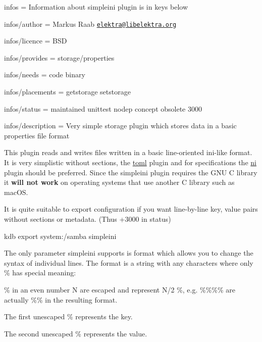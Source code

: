 
\begin{DoxyItemize}
\item infos = Information about simpleini plugin is in keys below
\item infos/author = Markus Raab \href{mailto:elektra@libelektra.org}{\tt elektra@libelektra.\+org}
\item infos/licence = B\+SD
\item infos/provides = storage/properties
\item infos/needs = code binary
\item infos/placements = getstorage setstorage
\item infos/status = maintained unittest nodep concept obsolete 3000
\item infos/description = Very simple storage plugin which stores data in a basic properties file format
\end{DoxyItemize}

This plugin reads and writes files written in a basic line-\/oriented ini-\/like format. It is very simplistic without sections, the \hyperlink{autotoc_md635_src_plugins_toml_README_md}{toml} plugin and for specifications the \hyperlink{autotoc_md469_src_plugins_ni_README_md}{ni} plugin should be preferred. Since the {\ttfamily simpleini} plugin requires the G\+NU C library it {\bfseries will not work} on operating systems that use another C library such as mac\+OS.

It is quite suitable to export configuration if you want line-\/by-\/line key, value pairs without sections or metadata. (Thus +3000 in status)


\begin{DoxyCode}
kdb export system:/samba simpleini
\end{DoxyCode}


The only parameter simpleini supports is {\ttfamily format} which allows you to change the syntax of individual lines. The {\ttfamily format} is a string with any characters where only {\ttfamily \%} has special meaning\+:


\begin{DoxyItemize}
\item {\ttfamily \%} in an even number N are escaped and represent N/2 {\ttfamily \%}, e.\+g. {\ttfamily \%\%\%\%} are actually {\ttfamily \%\%} in the resulting format.
\item The first unescaped {\ttfamily \%} represents the key.
\item The second unescaped {\ttfamily \%} represents the value.
\end{DoxyItemize}

